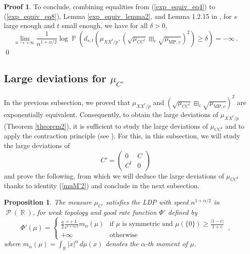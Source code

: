 \documentclass[11pt,a4paper]{article}
\DeclareMathOperator{\R}{\mathbb{R}}
\DeclareMathOperator{\PR}{\mathbb{P}}
\DeclareMathOperator{\PP}{\mathcal{P}}
\DeclareMathOperator{\1}{\mathbf{1}}
\newcommand{\mump}{\mu_{\mathrm{MP},c}}
\newtheorem{Proposition}{Proposition}[section]
\theoremstyle{definition}
\newtheorem*{Proof}{Proof}
\begin{document}
\begin{Proof}
To conclude, combining equalities from (\ref{exp_equiv_eq4}) to (\ref{exp_equiv_eq8}), Lemma \ref{exp_equiv_lemma2}, and Lemma 1.2.15 in \cite{DZ}, for $s$ large enough and $t$ small enough, we have for all $\delta>0$,
\begin{displaymath}
\lim_{n \to +\infty} \frac{1}{n^{1+\alpha/2}} \log \PR \left( d_{s,t} \left( \mu_{XX^t/p} , \left( \sqrt{\mu_{CC^t}} \boxplus_c \sqrt{\mump} \right)^2 \right) \ge \delta \right) = -\infty \, .
\end{displaymath}
\qed
\end{Proof}




\subsection{Large deviations for $\mu_{C'}$}

In the previous subsection, we proved that $\mu_{XX^t/p}$ and $\left( \sqrt{\mu_{CC^t}} \boxplus_c \sqrt{\mump} \right)^2$ are exponentially equivalent. Consequently, to obtain the large deviations of $\mu_{XX^t/p}$ (Theorem \ref{theorem2}), it is sufficient to study the large deviations of $\mu_{CC^t}$ and to apply the contraction principle (see \cite[Theorem 4.2.1]{DZ}). For this, in this subsection, we will study the large deviations of
\begin{displaymath}
C' = \left( \begin{array}{c|c} 0 & C \\ \hline C^t & 0 \end{array} \right)
\end{displaymath}
and prove the following, from which we will deduce the large deviations of $\mu_{CC^t}$ thanks to identity (\ref{muM'2}) and conclude in the next subsection.

\begin{Proposition} \label{LDP_C'}
The measure $\mu_{C'}$ satisfies the LDP with speed $n^{1+\alpha/2}$ in $\PP(\R)$, for weak topology and good rate function $\Phi'$ defined by
\begin{equation} \label{Phi'}
\Phi'(\mu) = \left\{ \begin{array}{ll} \frac{a}{2} \frac{c+1}{c^{1+\alpha/2}} m_{\alpha}(\mu) & \textrm{if $\mu$ is symmetric and } \mu(\{0\}) \ge \frac{|1-c|}{1+c} \\ +\infty & \textrm{otherwise} \end{array} \right. \, ,
\end{equation}
where $m_{\alpha}(\mu) = \int_{\R} |x|^{\alpha} \, d\mu(x)$ denotes the $\alpha$-th moment of $\mu$.
\end{Proposition}
\end{document}
